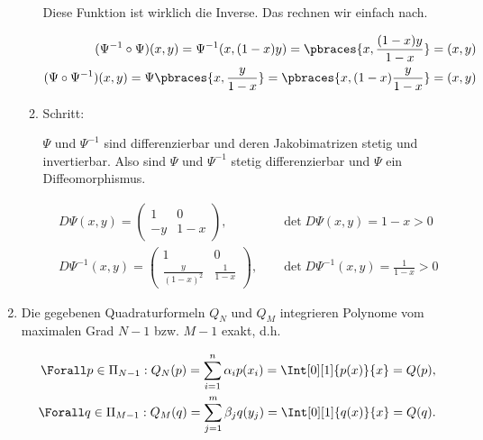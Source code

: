 \begin{solution}
\begin{enumerate}[label = \textbf{\alph*)}]
\begin{enumerate}[label = \arabic*.]
      Diese Funktion ist wirklich die Inverse.
      Das rechnen wir einfach nach.
    
      \begin{align*}
        (\Psi^{-1} \circ \Psi)(x, y)
        =
        \Psi^{-1}(x, (1 - x) y)
        =
        \pbraces{x, \frac{(1 - x) y}{1 - x}}
        =
        (x, y) \\
        (\Psi \circ \Psi^{-1})(x, y)
        =
        \Psi \pbraces{x, \frac{y}{1 - x}}
        =
        \pbraces{x, (1 - x) \frac{y}{1 - x}}
        =
        (x, y)
      \end{align*}
  
      \item Schritt:
      
      $\Psi$ und $\Psi^{-1}$ sind differenzierbar und deren Jakobimatrizen stetig und invertierbar.
      Also sind $\Psi$ und $\Psi^{-1}$ stetig differenzierbar und $\Psi$ ein Diffeomorphismus.
  
      \begin{align*}
        D \Psi(x, y)
        =
        \begin{pmatrix}
          1  & 0 \\
          -y & 1 - x
        \end{pmatrix},
        & \quad
        \det D \Psi(x, y) = 1 - x > 0 \\
        D \Psi^{-1}(x, y)
        =
        \begin{pmatrix}
          1                   & 0 \\
          \frac{y}{(1 - x)^2} & \frac{1}{1 - x}
        \end{pmatrix},
        & \quad
        \det D \Psi^{-1}(x, y) = \frac{1}{1 - x} > 0
      \end{align*}
    
    \end{enumerate}
  
  
    \item Die gegebenen Quadraturformeln $Q_N$ und $Q_M$ integrieren Polynome vom maximalen Grad $N - 1$ bzw. $M - 1$ exakt, d.h.
  
    \begin{align*}
      \Forall p \in \Pi_{N - 1}:
      Q_N(p)
      =
      \sum_{i = 1}^n \alpha_i p(x_i)
      =
      \Int[0][1]{p(x)}{x}
      =
      Q(p), \\
      \Forall q \in \Pi_{M - 1}:
      Q_M(q)
      =
      \sum_{j = 1}^m \beta_j q(y_j)
      =
      \Int[0][1]{q(x)}{x}
      =
      Q(q).
    \end{align*}
  

\end{enumerate}
\end{solution}
